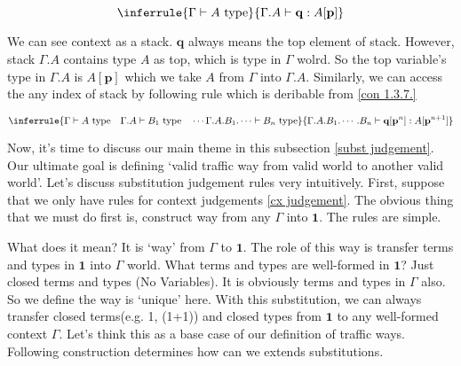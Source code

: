 \documentclass[12pt, a4paper, openany, twoside]{book}
\theoremstyle{definition}
\theoremstyle{remark}
\theoremstyle{plain}
\numberwithin{equation}{section}
\begin{document}
\begin{tcolorbox}[colback=yellow!10!white,colframe=green!75!black,title=Construction 1.3.7.]\label{con 1.3.7.}
\[
\inferrule
{\Gamma \vdash A \text{ type}}
{\Gamma.A \vdash \mathbf{q} : A[\mathbf{p}]}
\]
\end{tcolorbox}
We can see context as a stack. $\mathbf{q}$ always means the top element of stack. 
However, stack $\Gamma.A$ contains type $A$ as top, which is type in $\Gamma$ wolrd. So 
the top variable's type in $\Gamma.A$ is $A[\mathbf{p}]$ which we take $A$ from $\Gamma$ into $\Gamma.A$. Similarly, we can 
access the any index of stack by following rule which is deribable from \ref{con 1.3.7.} 
\begin{tcolorbox}[colback=yellow!10!white,colframe=red!75!black,title=Corolary 1.3.8.]
\[
\inferrule
{\Gamma \vdash A \text{ type} \quad \Gamma.A \vdash B_1 \text{ type} \quad \cdots \Gamma.A.B_1.\cdots \vdash B_n \text{ type}}
{\Gamma.A.B_1.\cdots.B_n \vdash \mathbf{q}[\mathbf{p}^n] : A[\mathbf{p}^{n+1}]}
\]
\end{tcolorbox}
Now, it's time to discuss our main theme in this subsection \ref{subst judgement}.
Our ultimate goal is defining \lq valid traffic way from valid world to another valid world'. Let's discuss substitution 
judgement rules very intuitively. First, suppose that we only have rules for context judgements \ref{cx judgement}. 
The obvious thing that we must do first is, construct way from any $\Gamma$ into $\mathbf{1}$. The rules are simple. 
\begin{tcolorbox}[colback=yellow!10!white,colframe=green!75!black,title=Construction 1.3.9.]
\end{tcolorbox}
\vspace{4mm}
What does it mean? It is \lq way' from $\Gamma$ to $\mathbf{1}$. The role of this way is transfer terms and types in $\mathbf{1}$ into $\Gamma$ world. 
What terms and types are well-formed in $\mathbf{1}$? Just closed terms and types (No Variables). It is obviously 
terms and types in $\Gamma$ also. So we define the way is \lq unique' here. With this substitution, 
we can always transfer closed terms(e.g. 1, (1+1)) and closed types from $\mathbf{1}$ to any well-formed context $\Gamma$.  
Let's think this as a base case of our definition of traffic ways. Following construction determines how can we extends substitutions. 
\end{document}

